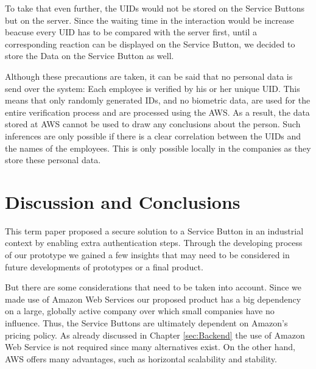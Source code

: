 To take that even further, the UIDs would not be stored on the Service Buttons but on the server. Since the waiting time in the interaction would be increase beacuse every UID has to be compared with the server first, until a corresponding reaction can be displayed on the Service Button, we decided to store the Data on the Service Button as well.

Although these precautions are taken, it can be said that no personal data is send over the system: Each employee is verified by his or her unique UID. This means that only randomly generated IDs, and no biometric data, are used for the entire verification process and are processed using the AWS. As a result, the data stored at AWS cannot be used to draw any conclusions about the person. Such inferences are only possible if there is a clear correlation between the UIDs and the names of the employees. This is only possible locally in the companies as they store these personal data.

\section{Discussion and Conclusions}
\label{sec:Future}

This term paper proposed a secure solution to a Service Button in an industrial context by enabling extra authentication steps. Through the developing process of our prototype we gained a few insights that may need to be considered in future developments of prototypes or a final product.

But there are some considerations that need to be taken into account. Since we made use of Amazon Web Services our proposed product has a big dependency on a large, globally active company over which small companies have no influence. Thus, the Service Buttons are ultimately dependent on Amazon's pricing policy. As already discussed in Chapter \ref{sec:Backend} the use of Amazon Web Service is not required since many alternatives exist. On the other hand, AWS offers many advantages, such as horizontal scalability and stability.

